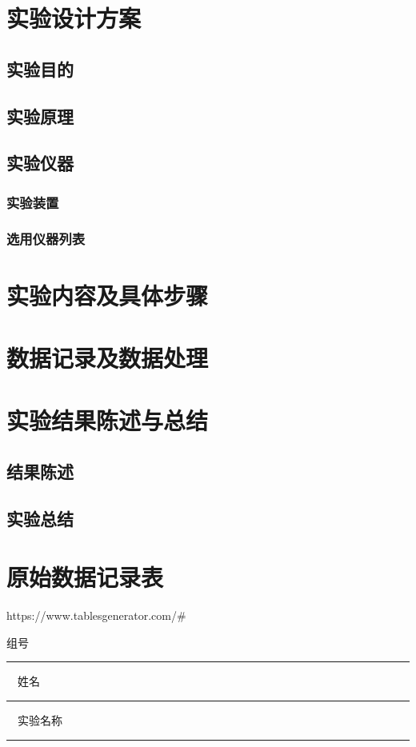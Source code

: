 \documentclass[a4paper,zihao=5,UTF8,fontset=fandol]{phyreport}
\begin{document}
\phyExpCover


\fancypage{\fbox}{} %

\section{实验设计方案}

\subsection{实验目的}

\subsection{实验原理}

\subsection{实验仪器}

\subsubsection{实验装置}

\subsubsection{选用仪器列表}

\smartLongLine
\section{实验内容及具体步骤}

\smartLongLine
\section{数据记录及数据处理}

\smartLongLine
\section{实验结果陈述与总结}

\subsection{结果陈述}

\subsection{实验总结}

\endBox


\newpage
\thispagestyle{empty}

\fancypage{ }{}
\section*{原始数据记录表}
https://www.tablesgenerator.com/#

\noindent 组号 \rule[-5pt]{2cm}{0.4pt} \ \ 姓名 \rule[-5pt]{2cm}{0.4pt} \ \ 实验名称 \rule[-5pt]{5cm}{0.4pt}
\end{document}
